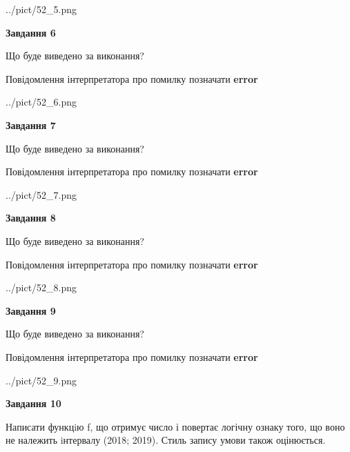 \documentclass[12pt, ukrainian]{article}
\begin{document}
{\begin {large}
\begin{center}
	{../pict/52_5.png}
\end{center}
\newpage

{\begin {center}\textbf{Завдання 6}\end {center}}\par
Що буде виведено за виконання? \par
Повідомлення інтерпретатора про помилку позначати \textbf{error}

\begin{center}
	{../pict/52_6.png}
\end{center}
\newpage

{\begin {center}\textbf{Завдання 7}\end {center}}\par
Що буде виведено за виконання? \par
Повідомлення інтерпретатора про помилку позначати \textbf{error}

\begin{center}
	{../pict/52_7.png}
\end{center}
\newpage

{\begin {center}\textbf{Завдання 8}\end {center}}\par
Що буде виведено за виконання? \par
Повідомлення інтерпретатора про помилку позначати \textbf{error}

\begin{center}
	{../pict/52_8.png}
\end{center}
\newpage

{\begin {center}\textbf{Завдання 9}\end {center}}\par
Що буде виведено за виконання? \par
Повідомлення інтерпретатора про помилку позначати \textbf{error}

\begin{center}
	{../pict/52_9.png}
\end{center}
\newpage

{\begin {center}\textbf{Завдання 10}\end {center}}\par

Написати функцiю f, що отримує число і повертає логічну ознаку того, що воно не належить iнтервалу (2018; 2019). Стиль запису умови також оцінюється.\par
\newpage

\end {large}}
\end{document}
